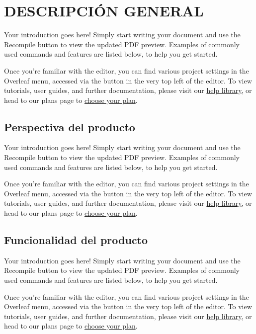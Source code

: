 \documentclass {article}
\begin{document}
\newpage
\section{DESCRIPCIÓN GENERAL}
Your introduction goes here! Simply start writing your document and use the Recompile button to view the updated PDF preview. Examples of commonly used commands and features are listed below, to help you get started.

Once you're familiar with the editor, you can find various project settings in the Overleaf menu, accessed via the button in the very top left of the editor. To view tutorials, user guides, and further documentation, please visit our \href{https://www.overleaf.com/learn}{help library}, or head to our plans page to \href{https://www.overleaf.com/user/subscription/plans}{choose your plan}.
\subsection{Perspectiva del producto}
Your introduction goes here! Simply start writing your document and use the Recompile button to view the updated PDF preview. Examples of commonly used commands and features are listed below, to help you get started.

Once you're familiar with the editor, you can find various project settings in the Overleaf menu, accessed via the button in the very top left of the editor. To view tutorials, user guides, and further documentation, please visit our \href{https://www.overleaf.com/learn}{help library}, or head to our plans page to \href{https://www.overleaf.com/user/subscription/plans}{choose your plan}.
\subsection{Funcionalidad del producto}
Your introduction goes here! Simply start writing your document and use the Recompile button to view the updated PDF preview. Examples of commonly used commands and features are listed below, to help you get started.

Once you're familiar with the editor, you can find various project settings in the Overleaf menu, accessed via the button in the very top left of the editor. To view tutorials, user guides, and further documentation, please visit our \href{https://www.overleaf.com/learn}{help library}, or head to our plans page to \href{https://www.overleaf.com/user/subscription/plans}{choose your plan}.
\end{document}
